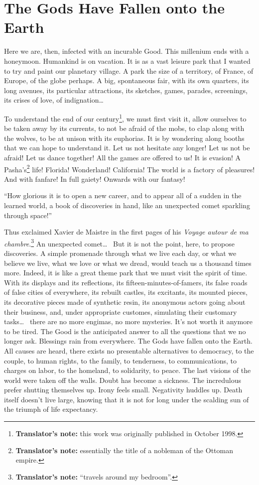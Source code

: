 \chapter{The Gods Have Fallen onto the Earth}
\label{ch:1}

Here we are, then, infected with an incurable Good. This millenium ends with a honeymoon. Humankind is on vacation. It is as a vast leisure park that I wanted to try and paint our planetary village. A park the size of a territory, of France, of Europe, of the globe perhaps. A big, spontaneous fair, with its own quarters, its long avenues, its particular attractions, its sketches, games, parades, screenings, its crises of love, of indignation\dots~

To understand the end of our century\footnote{\textbf{Translator's note:} this work was originally published in October 1998.}, we must first visit it, allow ourselves to be taken away by its currents, to not be afraid of the mobs, to clap along with the wolves, to be at unison with its euphorias. It is by wondering along booths that we can hope to understand it. Let us not hesitate any longer! Let us not be afraid! Let us dance together! All the games are offered to us! It is evasion! A Pasha's\footnote{\textbf{Translator's note:} essentially the title of a nobleman of the Ottoman empire.} life! Florida! Wonderland! California! The world is a factory of pleasures! And with fanfare! In full gaiety! Onwards with our fantasy!

``How glorious it is to open a new career, and to appear all of a sudden in the learned world, a book of discoveries in hand, like an unexpected comet sparkling through space!''

Thus exclaimed Xavier de Maistre in the first pages of his \textit{Voyage autour de ma chambre}.\footnote{\textbf{Translator's note:} ``travels around my bedroom''.} An unexpected comet\dots~ But it is not the point, here, to propose discoveries. A simple promenade through what we live each day, or what we believe we live, what we love or what we dread, would teach us a thousand times more. Indeed, it is like a great theme park that we must visit the spirit of time. With its displays and its reflections, its fifteen-minutes-of-famers, its false roads of false cities of everywhere, its rebuilt castles, its excitants, its mounted pieces, its decorative pieces made of synthetic resin, its anonymous actors going about their business, and, under appropriate customes, simulating their customary tasks\dots~ there are no more engimas, no more mysteries. It's not worth it anymore to be tired. The Good is the anticipated answer to all the questions that we no longer ask. Blessings rain from everywhere. The Gods have fallen onto the Earth. All causes are heard, there exists no presentable alternatives to democracy, to the couple, to human rights, to the family, to tenderness, to communications, to charges on labor, to the homeland, to solidarity, to peace. The last visions of the world were taken off the walls. Doubt has become a sickness. The incredulous prefer shutting themselves up. Irony feels small. Negativity huddles up. Death itself doesn't live large, knowing that it is not for long under the scalding sun of the triumph of life expectancy.

